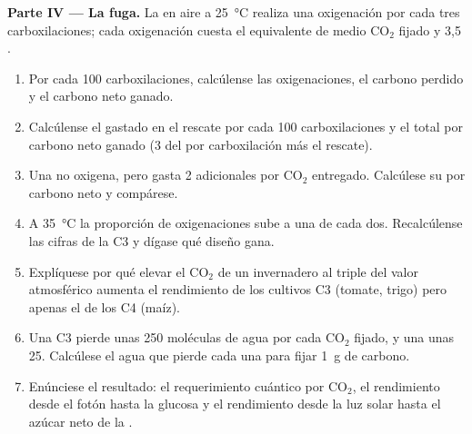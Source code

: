 \begin{problem}
\medskip
\noindent\textbf{Parte IV --- La fuga.}
La  en aire a \qty{25}{\celsius} realiza una oxigenación por cada
tres carboxilaciones; cada oxigenación cuesta el equivalente de medio
$\mathrm{CO_2}$ fijado y 3,5 .
\begin{enumerate}[resume]
  \item Por cada 100 carboxilaciones, calcúlense las oxigenaciones, el
        carbono perdido y el carbono neto ganado.
  \item Calcúlense el  gastado en el rescate por cada 100
        carboxilaciones y el  total por carbono neto ganado (3  del
         por carboxilación más el rescate).
  \item Una  no oxigena, pero gasta 2  adicionales por
        $\mathrm{CO_2}$ entregado. Calcúlese su  por carbono neto y
        compárese.
  \item A \qty{35}{\celsius} la proporción de oxigenaciones sube a una de
        cada dos. Recalcúlense las cifras de la C3 y dígase qué diseño
        gana.
  \item Explíquese por qué elevar el $\mathrm{CO_2}$ de un invernadero al
        triple del valor atmosférico aumenta el rendimiento de los cultivos
        C3 (tomate, trigo) pero apenas el de los C4 (maíz).
  \item Una  C3 pierde unas 250 moléculas de agua por cada
        $\mathrm{CO_2}$ fijado, y una  unas 25. Calcúlese el agua
        que pierde cada una para fijar \qty{1}{g} de carbono.
  \item Enúnciese el resultado: el requerimiento cuántico por
        $\mathrm{CO_2}$, el rendimiento desde el fotón hasta la glucosa y
        el rendimiento desde la luz solar hasta el azúcar neto de la .
\end{enumerate}
\end{problem}
